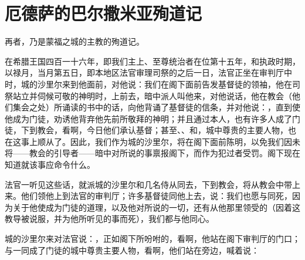 
\chapter{厄德萨的巴尔撒米亚殉道记}


再者，乃是蒙福之城的主教的殉道记。\par

在希腊王国四百一十六年，即我们主上、至尊统治者在位第十五年，和执政时期，以禄月，当月第五日，即本地区法官审理司祭的之后一日，法官正坐在审判厅中时，城的沙里尔来到他面前，对他说：我们在阁下面前告发基督徒的领袖，他在司祭站立并伺候可敬的神明时，上前去，暗中派人叫他来，对他说话，他在教会（他们集会之处）所诵读的书中的话，向他背诵了基督徒的信条，并对他说：，直到使他成为门徒，劝诱他背弃他先前所敬拜的神明；并且通过本人，也有许多人成了门徒，下到教会，看啊，今日他们承认基督；甚至、、和，城中尊贵的主要人物，也在这事上顺从了。因此，我们作为城的沙里尔，将在阁下面前陈明，以免我们因未将——教会的引导者——暗中对所说的事禀报阁下，而作为犯过者受罚。阁下现在知道就该事应命令什么。\par

法官一听见这些话，就派城的沙里尔和几名侍从同去，下到教会，将从教会中带上来。他们领他上到法官的审判厅；许多基督徒同他上去，说：我们也愿与同死，因为关于他使成为门徒的道理，以及他对所说的一切，还有从他那里领受的（因着这教导被说服，并为他所听见的事而死），我们都与他同心。\par

城的沙里尔来对法官说：，正如阁下所吩咐的，看啊，他站在阁下审判厅的门口；与一同成了门徒的城中尊贵主要人物，看啊，他们站在旁边，喊着说：\par

